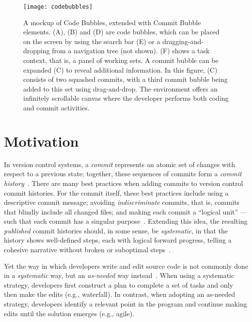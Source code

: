 \documentclass[conference]{IEEEtran}
\newcommand{\purpose}[1]{}
\begin{document}
\begin{figure*}
\centering
\texttt{[image: codebubbles]}
\caption{A mockup of Code Bubbles, extended with Commit Bubble elements. 
(A), (B) and (D) are code bubbles, which can be placed on the screen by using the search bar (E) or a dragging-and-dropping from a navigation tree (not shown). 
(F) shows a task context, that is, a panel of working sets.
A commit bubble can be expanded (C) to reveal additional information. 
In this figure, (C) consists of two squashed commits, with a third commit bubble being added to this set using drag-and-drop. 
The environment offers an infinitely scrollable canvas where the developer performs both coding and commit activities.}
\label{fig:eclipse}
\end{figure*}

\section{Motivation}

\purpose{Best practices for version control commit messages.} 
In version control systems, a \emph{commit} represents an atomic set of changes with respect to a previous state; together, these sequences of commits form a \emph{commit history}~\cite{Loeliger2012}.
There are many best practices when adding commits to version control commit histories. 
For the commit itself, these best practices include using a descriptive commit message; 
avoiding \emph{indiscriminate} commits, that is, commits that blindly include all changed files; and making each commit a ``logical unit'' --- such that 
each commit has a singular purpose~\cite{GitBestPractices}.
Extending this idea, the resulting \emph{published} commit histories should, in some sense, be \emph{systematic}, 
in that the history shows well-defined steps, each with logical forward progress, telling a cohesive narrative without 
broken or suboptimal steps~\cite{Loeliger2012}.

\purpose{Coding activities use a different model than what VCS requires.} 
Yet the way in which developers write and edit source code is not commonly done in a \emph{systematic} way, but an \emph{as-needed} way instead~\cite{Perry1989,Littman1987}. 
When using a systematic strategy, developers first construct a plan to complete a set of tasks and only then make the edits (e.g., waterfall).
In contrast, when adopting an as-needed strategy, developers identify a relevant point in the program and continue making edits until the solution emerges (e.g., agile).
\end{document}
